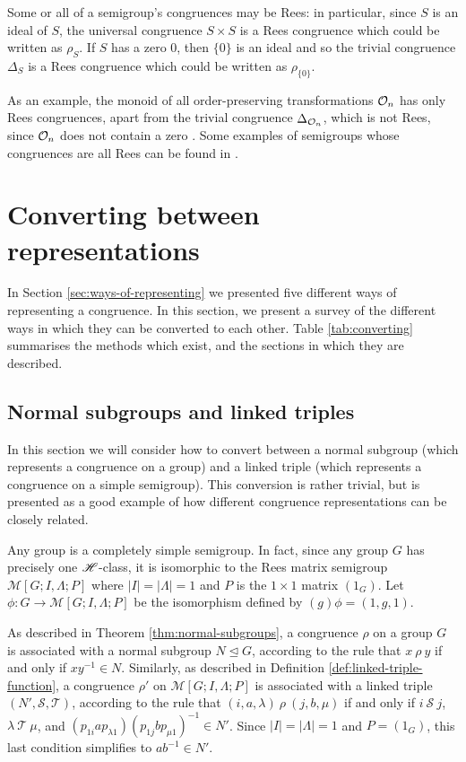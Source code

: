 Some or all of a semigroup's congruences may be Rees: in particular, since $S$
is an ideal of $S$, the universal congruence $S \times S$ is a Rees congruence
which could be written as $\rho_S$.  If $S$ has a zero $0$, then $\{0\}$ is an
ideal and so the trivial congruence $\Delta_S$ is a Rees congruence which could
be written as $\rho_{\{0\}}$.

As an example, the monoid of all order-preserving transformations $\mathcal{O}_n$ has
only Rees congruences, apart from the trivial congruence $\Delta_{\mathcal{O}_n}$, which
is not Rees, since $\mathcal{O}_n$ does not contain a zero \cite{lavers_1999}.
Some examples of semigroups whose congruences are all Rees can be found in
\cite[\S 5]{garcia_1991}.

\section{Converting between representations}
\label{sec:converting}

In Section \ref{sec:ways-of-representing} we presented five different ways of
representing a congruence.  In this section, we present a survey of the
different ways in which they can be converted to each other.  Table
\ref{tab:converting} summarises the methods which exist, and the sections in
which they are described.

\subsection{Normal subgroups and linked triples}
\label{sec:normal-subgroup-to-linked-triple}
In this section we will consider how to convert between a normal subgroup (which
represents a congruence on a group) and a linked triple (which represents a
congruence on a simple semigroup).  This conversion is rather trivial, but is
presented as a good example of how different congruence representations can be
closely related.

Any group is a completely simple semigroup.  In fact, since any group $G$ has
precisely one $\mathrel{\mathscr{H}}$-class, it is isomorphic to the Rees matrix semigroup
$\mathcal{M}[G; I, \Lambda; P]$ where $|I|=|\Lambda|={1}$ and $P$ is the
$1 \times 1$ matrix $(1_G)$.  Let $\phi: G \to \mathcal{M}[G; I, \Lambda; P]$ be
the isomorphism defined by $(g)\phi = (1, g, 1)$.

As described in Theorem \ref{thm:normal-subgroups}, a congruence $\rho$ on a
group $G$ is associated with a normal subgroup $N \trianglelefteq G$, according
to the rule that $x ~\rho~ y$ if and only if $xy^{-1} \in N$.  Similarly, as
described in Definition \ref{def:linked-triple-function}, a congruence $\rho'$
on $\mathcal{M}[G; I, \Lambda; P]$ is associated with a linked triple
$(N', \mathcal{S}, \mathcal{T})$, according to the rule that
$(i, a, \lambda) ~\rho~ (j, b, \mu)$ if and only if $i ~\mathcal{S}~ j$,
$\lambda ~\mathcal{T}~ \mu$, and
$(p_{1 i} a p_{\lambda 1}) (p_{1 j} b p_{\mu 1})^{-1} \in N'$.
Since $|I|=|\Lambda|={1}$ and $P=(1_G)$, this last condition simplifies to
$ab^{-1} \in N'$.

